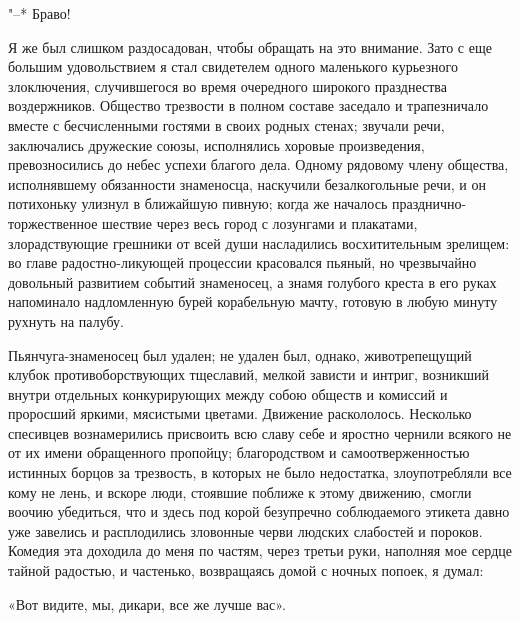 "--* Браво!

Я же  был слишком раздосадован,  чтобы обращать на это  внимание. Зато
с  еще  большим  удовольствием  я стал  свидетелем  одного  маленького
курьезного  злоключения,  случившегося  во время  очередного  широкого
празднества   воздержников.  Общество   трезвости  в   полном  составе
заседало  и  трапезничало  вместе  с  бесчисленными  гостями  в  своих
родных стенах; звучали речи,  заключались дружеские союзы, исполнялись
хоровые  произведения, превозносились  до небес  успехи благого  дела.
Одному рядовому  члену общества, исполнявшему  обязанности знаменосца,
наскучили  безалкогольные речи,  и он  потихоньку улизнул  в ближайшую
пивную; когда же началось  празднично-торжественное шествие через весь
город  с  лозунгами  и  плакатами,  злорадствующие  грешники  от  всей
души насладились  восхитительным зрелищем: во  главе радостно-ликующей
процессии  красовался  пьяный,   но  чрезвычайно  довольный  развитием
событий знаменосец,  а знамя  голубого креста  в его  руках напоминало
надломленную бурей  корабельную мачту, готовую в  любую минуту рухнуть
на палубу.

Пьянчуга-знаменосец был удален; не  удален был, однако, животрепещущий
клубок   противоборствующих  тщеславий,   мелкой  зависти   и  интриг,
возникший  внутри  отдельных  конкурирующих   между  собою  обществ  и
комиссий и проросший яркими,  мясистыми цветами. Движение раскололось.
Несколько спесивцев  вознамерились присвоить всю славу  себе и яростно
чернили всякого не  от их имени обращенного  пропойцу; благородством и
самоотверженностью  истинных борцов  за трезвость,  в которых  не было
недостатка, злоупотребляли все  кому не лень, и  вскоре люди, стоявшие
поближе  к  этому  движению,  смогли воочию  убедиться,  что  и  здесь
под  корой  безупречно  соблюдаемого  этикета  давно  уже  завелись  и
расплодились зловонные черви людских  слабостей и пороков. Комедия эта
доходила до  меня по  частям, через третьи  руки, наполняя  мое сердце
тайной радостью,  и частенько,  возвращаясь домой  с ночных  попоек, я
думал:

«Вот видите, мы, дикари, все же лучше вас».

